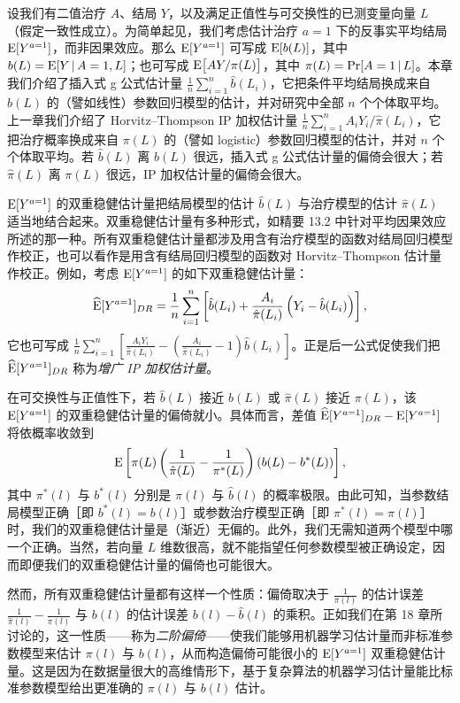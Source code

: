 \renewcommand{\TPname}{技术注记（Technical Point）}
\begin{techpoint}[增广 IP 加权估计量]
设我们有二值治疗 $A$、结局 $Y$，以及满足正值性与可交换性的已测变量向量 $L$（假定一致性成立）。为简单起见，我们考虑估计治疗 $a=1$ 下的反事实平均结局 $\mathrm{E}[Y^{a=1}]$，而非因果效应。那么 $\mathrm{E}[Y^{a=1}]$ 可写成 $\mathrm{E}[b(L)]$，其中 $b(L)=\mathrm{E}[Y\,|\, A=1,L]$；也可写成 $\mathrm{E}\bigl[AY/\pi(L)\bigr]$，其中 $\pi(L)=\Pr[A=1\,|\, L]$。本章我们介绍了插入式 g 公式估计量 $\frac{1}{n}\sum_{i=1}^{n}\hat b(L_i)$，它把条件平均结局换成来自 $b(L)$ 的（譬如线性）参数回归模型的估计，并对研究中全部 $n$ 个个体取平均。上一章我们介绍了 Horvitz--Thompson IP 加权估计量 $\frac{1}{n}\sum_{i=1}^{n}A_iY_i/\hat\pi(L_i)$，它把治疗概率换成来自 $\pi(L)$ 的（譬如 logistic）参数回归模型的估计，并对 $n$ 个个体取平均。若 $\hat b(L)$ 离 $b(L)$ 很远，插入式 g 公式估计量的偏倚会很大；若 $\hat\pi(L)$ 离 $\pi(L)$ 很远，IP 加权估计量的偏倚会很大。

$\mathrm{E}[Y^{a=1}]$ 的双重稳健估计量把结局模型的估计 $\hat b(L)$ 与治疗模型的估计 $\hat\pi(L)$ 适当地结合起来。双重稳健估计量有多种形式，如精要 13.2 中针对平均因果效应所述的那一种。所有双重稳健估计量都涉及用含有治疗模型的函数对结局回归模型作校正，也可以看作是用含有结局回归模型的函数对 Horvitz--Thompson 估计量作校正。例如，考虑 $\mathrm{E}[Y^{a=1}]$ 的如下双重稳健估计量：
\[
\widehat{\mathrm{E}}[Y^{a=1}]_{DR}=\frac{1}{n}\sum_{i=1}^{n}\left[\hat b(L_i)+\frac{A_i}{\hat\pi(L_i)}\left(Y_i-\hat b(L_i)\right)\right],
\]
它也可写成 $\frac{1}{n}\sum_{i=1}^{n}\left[\frac{A_iY_i}{\hat\pi(L_i)}-\left(\frac{A_i}{\hat\pi(L_i)}-1\right)\hat b(L_i)\right]$。正是后一公式促使我们把 $\widehat{\mathrm{E}}[Y^{a=1}]_{DR}$ 称为\emph{增广 IP 加权估计量}。

在可交换性与正值性下，若 $\hat b(L)$ 接近 $b(L)$ 或 $\hat\pi(L)$ 接近 $\pi(L)$，该 $\mathrm{E}[Y^{a=1}]$ 的双重稳健估计量的偏倚就小。具体而言，差值 $\widehat{\mathrm{E}}[Y^{a=1}]_{DR}-\mathrm{E}[Y^{a=1}]$ 将依概率收敛到
\[
\mathrm{E}\left[\pi(L)\left(\frac{1}{\hat\pi(L)}-\frac{1}{\pi^*(L)}\right)\left(b(L)-b^*(L)\right)\right],
\]
其中 $\pi^*(l)$ 与 $b^*(l)$ 分别是 $\hat\pi(l)$ 与 $\hat b(l)$ 的概率极限。由此可知，当参数结局模型正确［即 $b^*(l)=b(l)$］或参数治疗模型正确［即 $\pi^*(l)=\pi(l)$］时，我们的双重稳健估计量是（渐近）无偏的。此外，我们无需知道两个模型中哪一个正确。当然，若向量 $L$ 维数很高，就不能指望任何参数模型被正确设定，因而即便我们的双重稳健估计量的偏倚也可能很大。

然而，所有双重稳健估计量都有这样一个性质：偏倚取决于 $\frac{1}{\pi(l)}$ 的估计误差 $\frac{1}{\hat\pi(l)}-\frac{1}{\pi(l)}$ 与 $b(l)$ 的估计误差 $b(l)-\hat b(l)$ 的乘积。正如我们在第 18 章所讨论的，这一性质——称为\emph{二阶偏倚}——使我们能够用机器学习估计量而非标准参数模型来估计 $\pi(l)$ 与 $b(l)$，从而构造偏倚可能很小的 $\mathrm{E}[Y^{a=1}]$ 双重稳健估计量。这是因为在数据量很大的高维情形下，基于复杂算法的机器学习估计量能比标准参数模型给出更准确的 $\pi(l)$ 与 $b(l)$ 估计。
\end{techpoint}
\renewcommand{\TPname}{技术注记}

